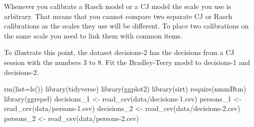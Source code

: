 \documentclass[
  letterpaper,
  DIV=11,
  numbers=noendperiod]{scrreprt}
\newenvironment{Shaded}{\begin{snugshade}}{\end{snugshade}}
\newcommand{\AttributeTok}[1]{\textcolor[rgb]{0.40,0.45,0.13}{#1}}
\newcommand{\FunctionTok}[1]{\textcolor[rgb]{0.28,0.35,0.67}{#1}}
\newcommand{\NormalTok}[1]{\textcolor[rgb]{0.00,0.23,0.31}{#1}}
\newcommand{\OtherTok}[1]{\textcolor[rgb]{0.00,0.23,0.31}{#1}}
\newcommand{\StringTok}[1]{\textcolor[rgb]{0.13,0.47,0.30}{#1}}
\begin{document}
Whenever you calibrate a Rasch model or a CJ model the scale you use is
arbitrary. That means that you cannot compare two separate CJ or Rasch
calibrations as the scales they use will be different. To place two
calibrations on the same scale you need to link them with common items.

To illustrate this point, the dataset decisions-2 has the decisions from
a CJ session with the numbers 3 to 8. Fit the Bradley-Terry model to
decisions-1 and decisions-2.

\begin{Shaded}
\begin{Highlighting}[]
\FunctionTok{rm}\NormalTok{(}\AttributeTok{list=}\FunctionTok{ls}\NormalTok{())}
\FunctionTok{library}\NormalTok{(tidyverse)}
\FunctionTok{library}\NormalTok{(ggplot2)}
\FunctionTok{library}\NormalTok{(sirt)}
\FunctionTok{require}\NormalTok{(nmmBtm)}
\FunctionTok{library}\NormalTok{(ggrepel)}
\NormalTok{decisions\_1 }\OtherTok{\textless{}{-}} \FunctionTok{read\_csv}\NormalTok{(}\StringTok{\textquotesingle{}data/decisions{-}1.csv\textquotesingle{}}\NormalTok{)}
\NormalTok{persons\_1 }\OtherTok{\textless{}{-}} \FunctionTok{read\_csv}\NormalTok{(}\StringTok{\textquotesingle{}data/persons{-}1.csv\textquotesingle{}}\NormalTok{)}
\NormalTok{decisions\_2 }\OtherTok{\textless{}{-}} \FunctionTok{read\_csv}\NormalTok{(}\StringTok{\textquotesingle{}data/decisions{-}2.csv\textquotesingle{}}\NormalTok{)}
\NormalTok{persons\_2 }\OtherTok{\textless{}{-}} \FunctionTok{read\_csv}\NormalTok{(}\StringTok{\textquotesingle{}data/persons{-}2.csv\textquotesingle{}}\NormalTok{)}
\end{Highlighting}
\end{Shaded}
\end{document}
